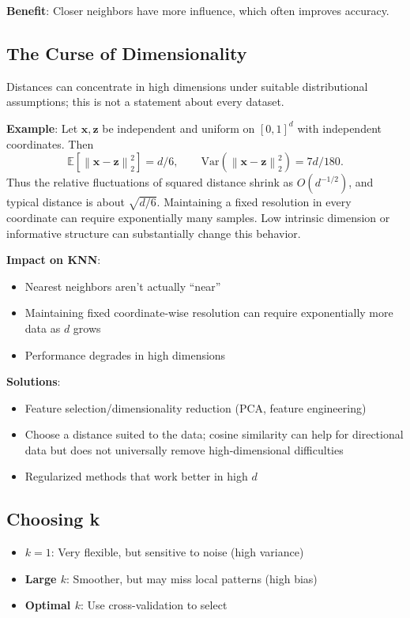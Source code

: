 \documentclass[11pt,twoside]{article}
\numberwithin{equation}{section}
\newcommand{\E}{\mathbb{E}}
\newcommand{\Var}{\mathrm{Var}}
\newcommand{\vect}[1]{\bm{#1}}
\newcommand{\norm}[1]{\left\lVert#1\right\rVert}
\theoremstyle{plain}
\theoremstyle{definition}
\theoremstyle{remark}
\newenvironment{keyidea}{
  \begin{tcolorbox}[colback=yellow!5!white,
                    colframe=yellow!50!black,
                    title=Key Idea,
                    breakable,
                    enhanced,
                    sharp corners,
                    boxrule=0.8pt,
                    left=6pt, right=6pt, top=6pt, bottom=6pt]
}{
  \end{tcolorbox}
}
\begin{document}
\textbf{Benefit}: Closer neighbors have more influence, which often improves accuracy.

\subsection{The Curse of Dimensionality}

\begin{keyidea}
Distances can concentrate in high dimensions under suitable distributional assumptions; this is not a statement about every dataset.

\textbf{Example}: Let $\vect{x},\vect{z}$ be independent and uniform on $[0,1]^d$ with independent coordinates. Then
\[
\E[\norm{\vect{x}-\vect{z}}_2^2]=d/6,\qquad
\Var(\norm{\vect{x}-\vect{z}}_2^2)=7d/180.
\]
Thus the relative fluctuations of squared distance shrink as $O(d^{-1/2})$, and typical distance is about $\sqrt{d/6}$. Maintaining a fixed resolution in every coordinate can require exponentially many samples. Low intrinsic dimension or informative structure can substantially change this behavior.

\textbf{Impact on KNN}:
\begin{itemize}
\item Nearest neighbors aren't actually ``near''
\item Maintaining fixed coordinate-wise resolution can require exponentially more data as $d$ grows
\item Performance degrades in high dimensions
\end{itemize}

\textbf{Solutions}:
\begin{itemize}
\item Feature selection/dimensionality reduction (PCA, feature engineering)
\item Choose a distance suited to the data; cosine similarity can help for directional data but does not universally remove high-dimensional difficulties
\item Regularized methods that work better in high $d$
\end{itemize}
\end{keyidea}

\subsection{Choosing k}

\begin{itemize}
\item \textbf{$k=1$}: Very flexible, but sensitive to noise (high variance)
\item \textbf{Large $k$}: Smoother, but may miss local patterns (high bias)
\item \textbf{Optimal $k$}: Use cross-validation to select
\end{itemize}
\end{document}
